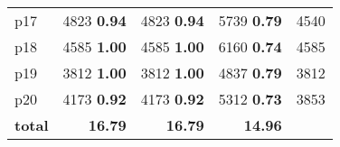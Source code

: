 \begin{tabular}{|l|rrr|r|}
p17 & {\footnotesize 4823} \textbf{0.94} & {\footnotesize 4823} \textbf{0.94} & {\footnotesize 5739} \textbf{0.79} & 4540\\
p18 & {\footnotesize 4585} \textbf{1.00} & {\footnotesize 4585} \textbf{1.00} & {\footnotesize 6160} \textbf{0.74} & 4585\\
p19 & {\footnotesize 3812} \textbf{1.00} & {\footnotesize 3812} \textbf{1.00} & {\footnotesize 4837} \textbf{0.79} & 3812\\
p20 & {\footnotesize 4173} \textbf{0.92} & {\footnotesize 4173} \textbf{0.92} & {\footnotesize 5312} \textbf{0.73} & 3853\\
\hline
\textbf{total} & \textbf{16.79} & \textbf{16.79} & \textbf{14.96} & \\
\hline
\end{tabular}

